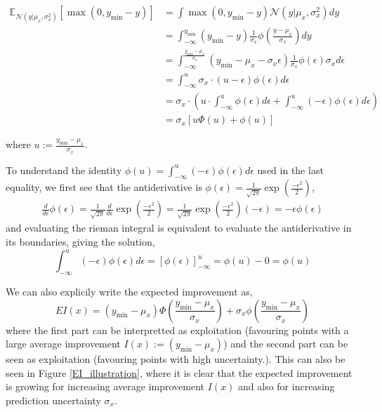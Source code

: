 \begin{align*}
    \mathbb{E}_{\mathcal{N}(y|\mu_x, \sigma_x^2)}[\max(0,y_{\min}-y)] &= \int \max(0,y_{\min}-y) \mathcal{N}(y|\mu_x, \sigma_x^2) dy\\
    &= \int_{-\infty}^{y_{\min}} (y_{\min}-y) \frac{1}{\sigma_x}\phi\left(\frac{y-\mu_x}{\sigma_x}\right) dy\\
    &= \int_{-\infty}^{\frac{y_{\min}-\mu_x}{\sigma_x}} (y_{\min}-\mu_x-\sigma_x\epsilon) \frac{1}{\sigma_x}\phi\left(\epsilon\right) \sigma_x d\epsilon\\
    &= \int_{-\infty}^u \sigma_x \cdot (u-\epsilon) \phi(\epsilon) d\epsilon\\
    &=  \sigma_x \cdot \left( u\cdot \int_{-\infty}^u \phi(\epsilon) d\epsilon +\int_{-\infty}^u (-\epsilon)  \phi(\epsilon) d\epsilon \right) \\
    &= \sigma_x [u\Phi(u)+ \phi(u)]
\end{align*}

where $u:=\frac{y_{\min}-\mu_x}{\sigma_x}$. 

\begin{note2}
    To understand the identity $\phi(u) = \int_{-\infty}^u
    (-\epsilon)  \phi(\epsilon) d\epsilon$ used in the last equality, we first see that the antiderivative
is $\phi(\epsilon) = \frac{1}{\sqrt{2\pi}} \exp\left(\frac{-\epsilon^2}{2}\right)$,
\begin{align*}
    \frac{d}{d \epsilon} \phi(\epsilon) =  \frac{1}{\sqrt{2\pi}}\frac{d}{d \epsilon}  \exp\left(\frac{-\epsilon^2}{2}\right) 
    =  \frac{1}{\sqrt{2\pi}}\exp\left(\frac{-\epsilon^2}{2}\right)(-\epsilon)
    = -\epsilon \phi(\epsilon)
\end{align*}
and evaluating the rieman integral is equivalent to evaluate the antiderivative in its boundaries, giving the 
solution, 
$$\int_{-\infty}^u
(-\epsilon)  \phi(\epsilon) d\epsilon = \left[\phi(\epsilon)\right]_{-\infty}^u = \phi(u)-0 = \phi(u)$$ 
\end{note2}

We can also explicily write the expected improvement as, 
$$EI(x) = (y_{\min}-\mu_x)\Phi\left(\frac{y_{\min}-\mu_x}{\sigma_x}\right)+ \sigma_x
\phi\left(\frac{y_{\min}-\mu_x}{\sigma_x}\right)$$ where the first part can be interpretted as
exploitation (favouring points with a large average improvement $I(x) := (y_{\min}-\mu_x)$) and the second
part can be seen as exploitation (favouring points with high uncertainty.). This can also be seen
in Figure \eqref{EI_illustration}, where it is clear that the expected improvement is growing for
increasing average improvement $I(x)$ and also for increasing prediction uncertainty $\sigma_x$.

